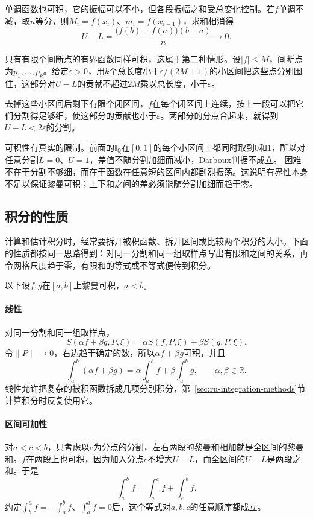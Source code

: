 单调函数也可积，它的振幅可以不小，但各段振幅之和受总变化控制。若$f$单调不减，取$n$等分，则$M_i=f(x_i)$、$m_i=f(x_{i-1})$，求和相消得
\[
 U-L=\frac{\bigl(f(b)-f(a)\bigr)(b-a)}n\to0.
\]

只有有限个间断点的有界函数同样可积，这属于第二种情形。设$|f|\leq M$，间断点为$p_1,\ldots,p_k$。给定$\varepsilon>0$，用$k$个总长度小于$\varepsilon/(2M+1)$的小区间把这些点分别围住，这部分对$U-L$的贡献不超过$2M$乘以总长度，小于$\varepsilon$。

去掉这些小区间后剩下有限个闭区间，$f$在每个闭区间上连续，按上一段可以把它们分割得足够细，使这部分的贡献也小于$\varepsilon$。两部分的分点合起来，就得到$U-L<2\varepsilon$的分割。

可积性有真实的限制。前面的$\mathbb I_{\mathbb Q}$在$[0,1]$的每个小区间上都同时取到$0$和$1$，所以对任意分割$L=0$、$U=1$，差值不随分割加细而减小，Darboux判据不成立。
困难不在于分割不够细，而在于函数在任意短的区间内都剧烈振荡。这说明有界性本身不足以保证黎曼可积；上下和之间的差必须能随分割加细而趋于零。

\subsection{积分的性质}
\label{sec:ru-integral-properties}

计算和估计积分时，经常要拆开被积函数、拆开区间或比较两个积分的大小。下面的性质都按同一思路得到：对同一分割和同一组取样点写出有限和之间的关系，再令网格尺度趋于零，有限和的等式或不等式便传到积分。

以下设$f,g$在$[a,b]$上黎曼可积，$a<b$。

\paragraph{线性}
对同一分割和同一组取样点，
\[
 S(\alpha f+\beta g,P,\xi)=\alpha S(f,P,\xi)+\beta S(g,P,\xi).
\]
令$\|P\|\to0$，右边趋于确定的数，所以$\alpha f+\beta g$可积，并且
\[
 \int_a^b(\alpha f+\beta g)=\alpha\int_a^bf+\beta\int_a^bg,\qquad\alpha,\beta\in\mathbb R.
\]
线性允许把复杂的被积函数拆成几项分别积分，第~\ref{sec:ru-integration-methods}节计算积分时反复使用它。

\paragraph{区间可加性}
对$a<c<b$，只考虑以$c$为分点的分割，左右两段的黎曼和相加就是全区间的黎曼和。$f$在两段上也可积，因为加入分点$c$不增大$U-L$，而全区间的$U-L$是两段之和。于是
\[
 \int_a^bf=\int_a^cf+\int_c^bf.
\]
约定$\int_b^af=-\int_a^bf$、$\int_a^af=0$后，这个等式对$a,b,c$的任意顺序都成立。

